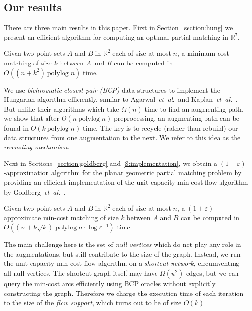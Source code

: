 \documentclass[a4paper,UKenglish]{socg-lipics-v2018}
\def\etal{\emph{et~al.}}
\def\etal{\textit{et~al.}}
\def\polylog{\mathop{\mathrm{polylog}}}
\def\eps{\varepsilon}
\def\reals{\mathbb{R}}
\theoremstyle{plain}
\numberwithin{figure}{section}
\begin{document}
\subsection{Our results}

There are three main results in this paper.
First in Section~\ref{section:hung} we present an efficient algorithm for
computing an optimal partial matching in $\reals^2$.

\begin{theorem}
\label{theorem:hung}
Given two point sets $A$ and $B$ in $\reals^2$ each of size at most $n$,
a minimum-cost matching of size $k$ between $A$ and $B$ can be computed in
$O((n + k^2)\polylog n)$ time.
\end{theorem}

We use \emph{bichromatic closest pair (BCP)} data structures to implement the Hungarian algorithm efficiently, similar to Agarwal~\etal\ and Kaplan~\etal~\cite{KMRSS17,AES99}.
But unlike their algorithms which take $\Omega(n)$ time to find an
augmenting path, we show that after $O(n\polylog n)$ preprocessing,
an augmenting path can be found in $O(k\polylog n)$ time.
The key is to recycle (rather than rebuild) our data structures from one
augmentation to the next.
We refer to this idea as the \emph{rewinding mechanism}.

\medskip

Next in Sections~\ref{section:goldberg} and \ref{S:implementation},
we obtain a $(1+\eps)$-approximation algorithm for the planar geometric partial
matching problem by providing an efficient implementation of the unit-capacity min-cost flow algorithm by
Goldberg~\etal~\cite{GHKT17}.

\begin{theorem}
\label{theorem:gmcm}
Given two point sets $A$ and $B$ in $\reals^2$ each of size at most $n$,
a $(1+\eps)$-approximate min-cost matching of size $k$ between $A$
and $B$ can be computed in $O((n + k\sqrt{k})\polylog n \cdot \log\eps^{-1})$ time.
\end{theorem}

The main challenge here is the set of \emph{null vertices}
which do not play any role in the augmentations, but still contribute to the size of the graph.
Instead, we run the unit-capacity min-cost flow algorithm on a
\emph{shortcut network}, circumventing all null vertices.
The shortcut graph itself may have $\Omega(n^2)$ edges, but we can query the min-cost arcs efficiently using BCP oracles without explicitly constructing the graph.
Therefore we charge the execution time of each iteration to the size of the \emph{flow support}, which turns out to be of size $O(k)$.
\end{document}
